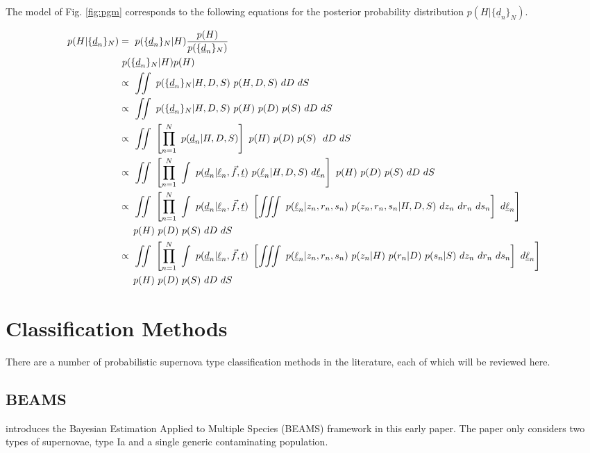 \documentclass[12pt, onecolumn]{emulateapj}
\newcommand{\textul}{\underline}
\begin{document}
The model of Fig. \ref{fig:pgm} corresponds to the following equations for the posterior probability distribution $p(H|\{\textul{d}_{n}\}_{N})$.  

\begin{align*}
p(H|\{\textul{d}_{n}\}_{N}) &=\ p(\{\textul{d}_{n}\}_{N}|H)\frac{p(H)}{p(\{\textul{d}_{n}\}_{N})}\\
&\ p(\{\textul{d}_{n}\}_{N}|H)p(H)\\
&\propto\ \iint\ p(\{\textul{d}_{n}\}_{N}|H,D,S)\ p(H,D,S)\ dD\ dS\\
&\propto\ \iint\ p(\{\textul{d}_{n}\}_{N}|H,D,S)\ p(H)\ p(D)\ p(S)\ dD\ dS\\
&\propto\ \iint\ \left[\prod_{n=1}^{N}\ p(\textul{d}_{n}|H,D,S)\right]\ p(H)\ p(D)\ p(S)\ \ dD\ dS\\
&\propto\ \iint\ \left[\prod_{n=1}^{N}\ \int\ p(\textul{d}_{n}|\textul{\ell}_{n},\vec{f},\textul{t})\ p(\textul{\ell}_{n}|H,D,S)\ d\textul{\ell}_{n}\right]\ p(H)\ p(D)\ p(S)\ dD\ dS\\
&\propto\ \iint\ \left[\prod_{n=1}^{N}\ \int\ p(\textul{d}_{n}|\textul{\ell}_{n},\vec{f},\textul{t})\ \left[\iiint\ p(\textul{\ell}_{n}|z_{n},r_{n},s_{n})\ p(z_{n},r_{n},s_{n}|H,D,S)\ dz_{n}\ dr_{n}\ ds_{n}\right]\ d\textul{\ell}_{n}\right]\\
&\indent p(H)\ p(D)\ p(S)\ dD\ dS\\
&\propto\ \iint\ \left[\prod_{n=1}^{N}\ \int\ p(\textul{d}_{n}|\textul{\ell}_{n},\vec{f},\textul{t})\ \left[\iiint\ p(\textul{\ell}_{n}|z_{n},r_{n},s_{n})\ p(z_{n}|H)\ p(r_{n}|D)\ p(s_{n}|S)\ dz_{n}\ dr_{n}\ ds_{n}\right]\ d\textul{\ell}_{n}\right]\\
&\indent p(H)\ p(D)\ p(S)\ dD\ dS
\end{align*}

\section{Classification Methods}

There are a number of probabilistic supernova type classification methods in the literature, each of which will be reviewed here.

\subsection{BEAMS}

\citet{Kunz07} introduces the Bayesian Estimation Applied to Multiple Species (BEAMS) framework in this early paper.  The paper only considers two types of supernovae, type Ia and a single generic contaminating population.  
\end{document}
